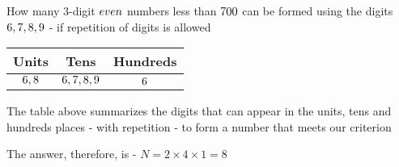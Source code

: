 \question[2] How many 3-digit $even$ numbers less than $700$ can be 
 formed using the digits $6,7,8,9$ - if repetition of digits is allowed


\watchout

\ifprintanswers
   \begin{table}
		\begin{tabular}{ccc}
			\toprule
			Units & Tens & Hundreds \\
			\midrule
			$6,8$ & $6,7,8,9$ & $6$ \\
			\bottomrule
		\end{tabular}
	\end{table}
\fi 

\begin{solution}[\mcq]
	The table above summarizes the digits that can appear in the units, tens and hundreds 
	places - with repetition - to form a number that meets our criterion 
	
	The answer, therefore, is - $ N = 2 \times 4 \times 1 = 8$
	
	
\end{solution}